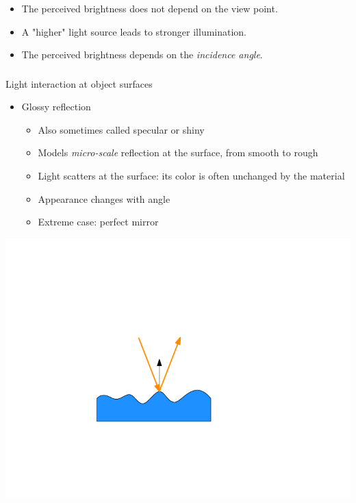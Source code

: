 \documentclass[utf8,stillsansserifmath,fleqn,t]{beamer}
\begin{document}
\begin{frame}[label=intro-diffuse]
\begin{itemize}
\item<2-> The perceived brightness does not depend on the view point.
\item<3-> A "higher" light source leads to stronger illumination.
\item<4-> The perceived brightness depends on the \emph{incidence angle}.
\end{itemize}
\end{frame}

\begin{frame}
\frametitle{\insertsection}
Light interaction at object surfaces
\begin{itemize}
\item Glossy reflection
    \begin{itemize}
    \item Also sometimes called specular or shiny
    \item Models \emph{micro-scale} reflection at the surface, from smooth to rough
    \item Light scatters at the surface: its color is often unchanged by the
    material
    \item Appearance changes with angle
    \item Extreme case: perfect mirror
    \end{itemize}
\end{itemize}
\centerline{\includegraphics[width=.5\textwidth]{./fig/reflection-glossy-physical.pdf}}
\end{frame}
\end{document}
